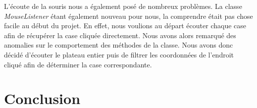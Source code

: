 \documentclass[12,french]{report}
\begin{document}
L'écoute de la souris nous a également posé de nombreux problèmes. La classe \textit{MouseListener} étant également nouveau pour nous, la comprendre était pas chose facile au début du projet. En effet, nous voulions au départ écouter chaque case afin de récupérer la case cliquée directement. Nous avons alors remarqué des anomalies sur le comportement des méthodes de la classe. Nous avons donc décidé d'écouter le plateau entier puis de filtrer les coordonnées de l'endroit cliqué afin de déterminer la case correspondante.


\chapter*{Conclusion}
\end{document}
